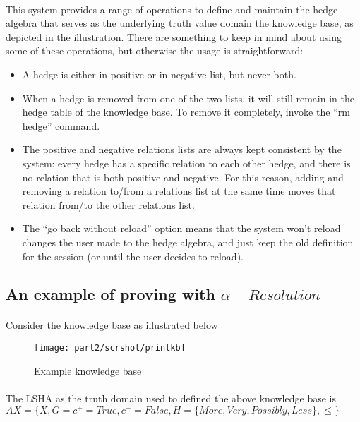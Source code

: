 \documentclass[../gr-final.tex]{subfiles}
\begin{document}
\paragraph{} This system provides a range of operations to define and maintain
the hedge algebra that serves as the underlying truth value
domain the knowledge base, as depicted in the illustration. There
are something to keep in mind about using some of these
operations, but otherwise the usage is straightforward:
\begin{itemize}
  \item A hedge is either in positive or in negative list, but
    never both.
  \item When a hedge is removed from one of the two lists, it
    will still remain in the hedge table of the knowledge base.
    To remove it completely, invoke the ``rm hedge'' command.
  \item The positive and negative relations lists are always kept
    consistent by the system: every hedge has a specific relation
    to each other hedge, and there is no relation that is both
    positive and negative. For this reason, adding and removing
    a relation to/from a relations list at the same time moves
    that relation from/to the other relations list.
  \item The ``go back without reload'' option means that the
    system won't reload changes the user made to the hedge
    algebra, and just keep the old definition for the session (or
    until the user decides to reload). 
\end{itemize}

\subsection{An example of proving with $\alpha-Resolution$}
\paragraph{} Consider the knowledge base as illustrated below
\begin{figure}[H]
  \centering
  \texttt{[image: part2/scrshot/printkb]}
  \caption{Example knowledge base}
\end{figure}
\paragraph{} The LSHA as the truth domain used to defined the
above knowledge base is $AX = \{X, G = {c^{+} = True, c^{-} =
False}, H = \{More, Very, Possibly, Less\}, \le\}$
\end{document}

